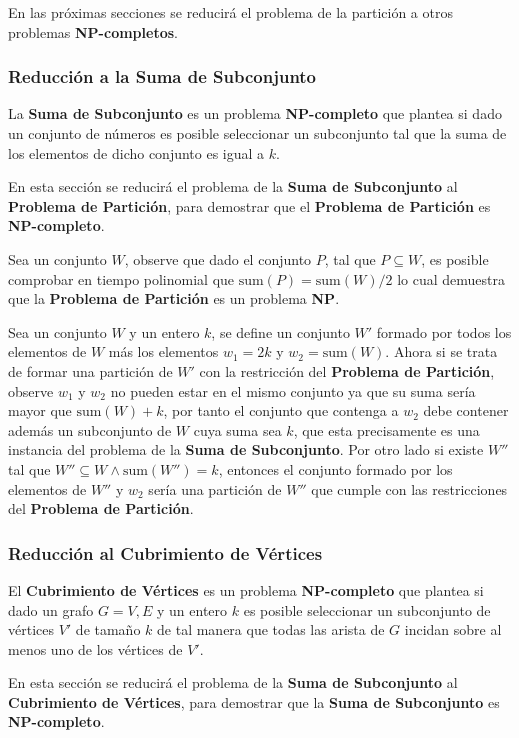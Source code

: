 \documentclass{article}
\begin{document}
En las próximas secciones se reducirá el problema de la partición a otros problemas \textbf{NP-completos}.

\subsubsection{Reducción a la Suma de Subconjunto}

La \textbf{Suma de Subconjunto} es un problema \textbf{NP-completo} que plantea si dado un conjunto de números es posible
seleccionar un subconjunto tal que la suma de los elementos de dicho conjunto es igual a $k$.

En esta sección se reducirá el problema de la \textbf{Suma de Subconjunto} al \textbf{Problema de Partición}, para demostrar
que el \textbf{Problema de Partición} es \textbf{NP-completo}.

Sea un conjunto $W$, observe que dado el conjunto $P$, tal que $P\subseteq W$, es posible comprobar en tiempo polinomial que $\text{sum}(P)=\text{sum}(W)/2$
lo cual demuestra que la \textbf{Problema de Partición} es un problema \textbf{NP}.

Sea un conjunto $W$ y un entero $k$, se define un conjunto $W'$ formado por todos los elementos de $W$ más los elementos
$w_1=2k$ y $w_2=\text{sum}(W)$. Ahora si se trata de formar una partición de $W'$ con la restricción del \textbf{Problema de Partición},
observe $w_1$ y $w_2$ no pueden estar en el mismo conjunto ya que su suma sería mayor que $\text{sum}(W)+k$, por tanto el conjunto
que contenga a $w_2$ debe contener además un subconjunto de $W$ cuya suma sea $k$, que esta precisamente es una instancia del problema de la \textbf{Suma de Subconjunto}.
Por otro lado si existe $W''$ tal que $W''\subseteq  W \wedge \text{sum}(W'')=k$, entonces el conjunto formado por los elementos de $W''$ y $w_2$
sería una partición de $W''$ que cumple con las restricciones del \textbf{Problema de Partición}.

\subsubsection{Reducción al Cubrimiento de Vértices}

El \textbf{Cubrimiento de Vértices} es un problema \textbf{NP-completo} que plantea si dado un grafo $G=V,E$ y un entero $k$ es posible
seleccionar un subconjunto de vértices $V'$ de tamaño $k$ de tal manera que todas las arista de $G$ incidan sobre al menos
uno de los vértices de $V'$.

En esta sección se reducirá el problema de la \textbf{Suma de Subconjunto} al \textbf{Cubrimiento de Vértices}, para demostrar
que la \textbf{Suma de Subconjunto} es \textbf{NP-completo}.
\end{document}
